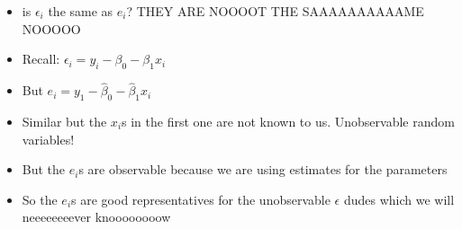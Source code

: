 \documentclass{article}
\begin{document}
\begin{itemize}
  \item is $ \epsilon_i $ the same as  $ e_i $? THEY ARE NOOOOT THE SAAAAAAAAAAME NOOOOO
  \item Recall: $ \epsilon_i = y_i - \beta_0 - \beta_1 x_i $
  \item But  $ e_i = y_1 - \hat{\beta}_0 - \hat{\beta}_1 x_i $
  \item Similar but the  $ x_i $s in the first one are not known to us. Unobservable random variables! 
  \item But the  $ e_i $s are observable because we are using estimates for the parameters
  \item So the $ e_i $s are good representatives for the unobservable $ \epsilon $ dudes which we will neeeeeeeever knoooooooow
  \end{itemize}
\end{document}
